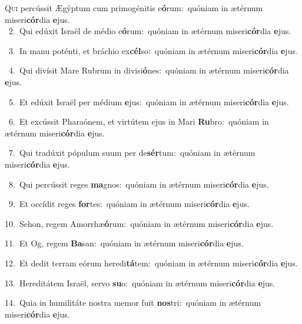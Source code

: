 \lettrine{\initial\textcolor{\initialcolor}{Q}}{ui} percússit Ægýptum cum primogénitis e\-\textbf{ó}\-rum:~\star quóniam in ætérnum miseri\-\textbf{cór}\-dia \textbf{e}\-jus.\\
{\numbfont\textcolor{\numbcolor}{~2.}}~Qui edúxit Israël de médio e\-\textbf{ó}\-rum:~\star quóniam in ætérnum miseri\-\textbf{cór}\-dia \textbf{e}\-jus.\par
{\numbfont\textcolor{\numbcolor}{~3.}}~In manu poténti, et bráchio ex\-\textbf{cél}\-so:~\star quóniam in ætérnum miseri\-\textbf{cór}\-dia \textbf{e}\-jus.\par
{\numbfont\textcolor{\numbcolor}{~4.}}~Qui divísit Mare Rubrum in divisi\-\textbf{ó}\-nes:~\star quóniam in ætérnum miseri\-\textbf{cór}\-dia \textbf{e}\-jus.\par
{\numbfont\textcolor{\numbcolor}{~5.}}~Et edúxit Israël per médium \textbf{e}\-jus:~\star quóniam in ætérnum miseri\-\textbf{cór}\-dia \textbf{e}\-jus.\par
{\numbfont\textcolor{\numbcolor}{~6.}}~Et excússit Pharaónem, et virtútem ejus in Mari \textbf{Ru}\-bro:~\star quóniam in ætérnum miseri\-\textbf{cór}\-dia \textbf{e}\-jus.\par
{\numbfont\textcolor{\numbcolor}{~7.}}~Qui tradúxit pópulum suum per de\-\textbf{sér}\-tum:~\star quóniam in ætérnum miseri\-\textbf{cór}\-dia \textbf{e}\-jus.\par
{\numbfont\textcolor{\numbcolor}{~8.}}~Qui percússit reges \textbf{ma}\-gnos:~\star quóniam in ætérnum miseri\-\textbf{cór}\-dia \textbf{e}\-jus.\par
{\numbfont\textcolor{\numbcolor}{~9.}}~Et occídit reges \textbf{for}\-tes:~\star quóniam in ætérnum miseri\-\textbf{cór}\-dia \textbf{e}\-jus.\par
{\numbfont\textcolor{\numbcolor}{10.}}~Sehon, regem Amorrhæ\-\textbf{ó}\-rum:~\star quóniam in ætérnum miseri\-\textbf{cór}\-dia \textbf{e}\-jus.\par
{\numbfont\textcolor{\numbcolor}{11.}}~Et Og, regem \textbf{Ba}\-san:~\star quóniam in ætérnum miseri\-\textbf{cór}\-dia \textbf{e}\-jus.\par
{\numbfont\textcolor{\numbcolor}{12.}}~Et dedit terram eórum heredi\-\textbf{tá}\-tem:~\star quóniam in ætérnum miseri\-\textbf{cór}\-dia \textbf{e}\-jus.\par
{\numbfont\textcolor{\numbcolor}{13.}}~Hereditátem Israël, servo \textbf{su}\-o:~\star quóniam in ætérnum miseri\-\textbf{cór}\-dia \textbf{e}\-jus.\par
{\numbfont\textcolor{\numbcolor}{14.}}~Quia in humilitáte nostra memor fuit \textbf{nos}\-tri:~\star quóniam in ætérnum miseri\-\textbf{cór}\-dia \textbf{e}\-jus.\par
